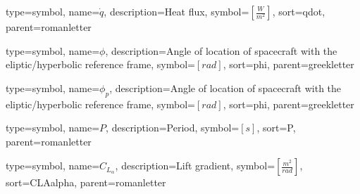 {
	type=symbol, %
	name={\ensuremath{\dot{q}}}, %
	description={Heat flux}, %
	symbol={$\left[ \frac{W}{m^2} \right]$}, %
	sort=qdot, %
	parent=romanletter %
}

{
type=symbol, %
name={\ensuremath{\phi}}, %
description={Angle of location of spacecraft with the eliptic/hyperbolic reference frame}, %
symbol={$\left[rad\right]$}, %
sort=phi, %
parent=greekletter %
}

{
type=symbol, %
name={\ensuremath{\phi_p}}, %
description={Angle of location of spacecraft with the eliptic/hyperbolic reference frame}, %
symbol={$\left[rad\right]$}, %
sort=phi, %
parent=greekletter %
}

{
	type=symbol, %
	name={\ensuremath{P}}, %
	description={Period}, %
	symbol={$\left[s\right]$}, %
	sort=P, %
	parent=romanletter %
}

{
	type=symbol, %
	name={\ensuremath{C_{L_\alpha}}}, %
	description={Lift gradient}, %
	symbol={$\left[\frac{m^2}{rad}\right]$}, %
	sort=CLAalpha, %
	parent=romanletter %
}

